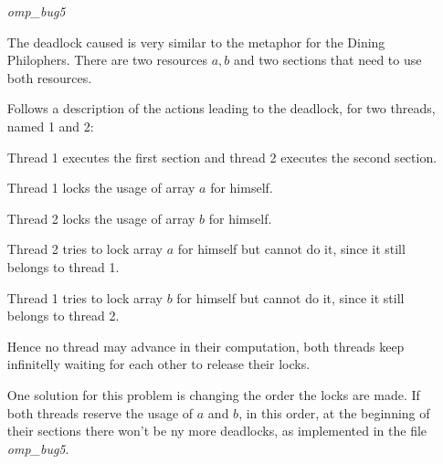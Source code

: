 \documentclass[unicode,11pt,a4paper,oneside,numbers=endperiod,openany]{scrartcl}
\begin{document}
\begin{itemize}
        \item[\textit{omp\_bug5}]

            The deadlock caused is very similar to the metaphor for the Dining Philophers.
            There are two resources $a, b$ and two sections that need to use both resources.

            Follows a description of the actions leading to the deadlock, for two threads, named 1 and 2:

            Thread 1 executes the first section and thread 2 executes the second section.

            Thread 1 locks the usage of array $a$ for himself.

            Thread 2 locks the usage of array $b$ for himself.

            Thread 2 tries to lock array $a$ for himself but cannot do it, since it still belongs to thread 1.

            Thread 1 tries to lock array $b$ for himself but cannot do it, since it still belongs to thread 2.

            Hence no thread may advance in their computation, both threads keep infinitelly waiting for each other to release their locks.

            One solution for this problem is changing the order the locks are made. If both threads reserve the usage of $a$ and $b$, in this order, at the beginning of their sections there won't be ny more deadlocks, as implemented in the file \textit{omp\_bug5}.

\end{itemize}
\end{document}
